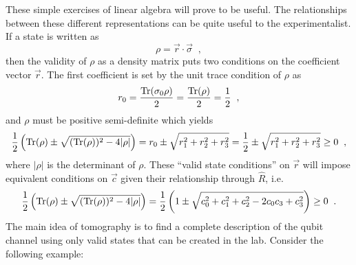 These simple exercises of linear algebra will prove to be useful.  The relationships between these different representations can be quite useful to the experimentalist.  If a state is written as
$$
\rho = \vec{r}\cdot\vec{\sigma}\;\;,
$$
then the validity of $\rho$ as a density matrix puts two conditions on the coefficient vector $\vec{r}$.  The first coefficient is set by the unit trace condition of $\rho$ as
$$
r_0 = \frac{\operatorname{Tr}(\sigma_0 \rho)}{2} = \frac{\operatorname{Tr}(\rho)}{2} = \frac{1}{2}\;\;,
$$  
and $\rho$ must be positive semi-definite which yields
$$
\frac{1}{2}\left(\operatorname{Tr}(\rho)\pm\sqrt{(\operatorname{Tr}(\rho))^2-4|\rho|}\right)=r_0\pm\sqrt{r_1^2+r_2^2+r_3^2} = \frac{1}{2}\pm\sqrt{r_1^2+r_2^2+r_3^2} \ge 0\;\;,
$$
where $|\rho|$ is the determinant of $\rho$.  These ``valid state conditions'' on $\vec{r}$ will impose equivalent conditions on $\vec{c}$ given their relationship through $\hat{R}$, i.e.\
$$
\frac{1}{2}\left(\operatorname{Tr}(\rho)\pm\sqrt{(\operatorname{Tr}(\rho))^2-4|\rho|}\right)=\frac{1}{2}\left(1\pm\sqrt{c_0^2 + c_1^2 + c_2^2 - 2 c_0 c_3 + c_3^2}\right)\ge 0\;\;.
$$
The main idea of tomography is to find a complete description of the qubit channel using only valid states that can be created in the lab.  Consider the following example:
